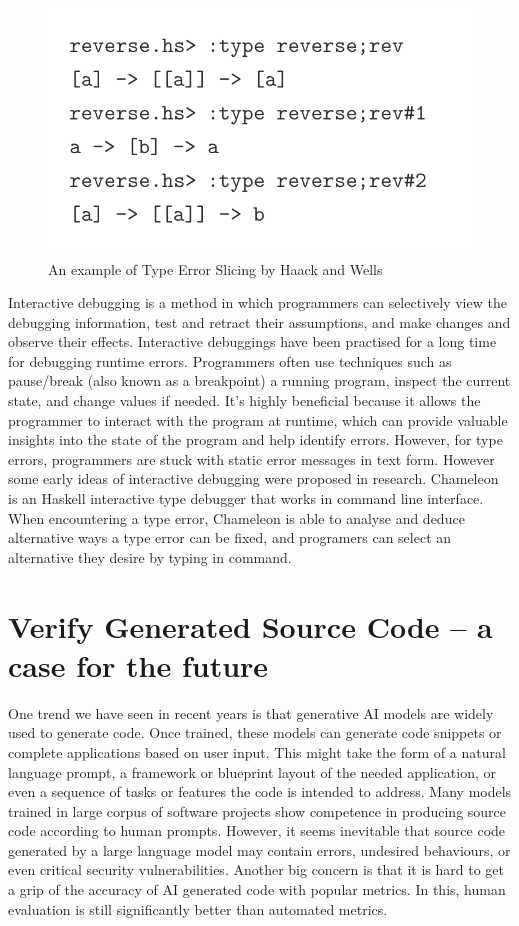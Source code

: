 \begin{figure}
    \includegraphics[]{ChameleonInteractive}
    \caption{An example of Type Error Slicing by Haack and Wells
    }
\end{figure}
Interactive debugging is a method in which programmers can selectively view the debugging information, test and retract their assumptions, and  make changes and observe their effects. Interactive debuggings have been practised for a long time for debugging runtime errors. Programmers often use techniques such as pause/break (also known as a breakpoint) a running program, inspect the current state, and change values if needed. It's highly beneficial because it allows the programmer to interact with the program at runtime, which can provide valuable insights into the state of the program and help identify errors. However, for type errors, programmers are stuck with static error messages in text form. However some early ideas of interactive debugging were proposed in research. Chameleon is an Haskell interactive type debugger that works in command line interface. When encountering a type error, Chameleon is able to analyse and deduce alternative ways a type error can be fixed, and programers can select an alternative they desire by typing in command.


\section{Verify Generated Source Code -- a case for the future}

One trend we have seen in recent years is that generative AI models are widely used to generate code. Once trained, these models can generate code snippets or complete applications based on user input. This might take the form of a natural language prompt, a framework or blueprint layout of the needed application, or even a sequence of tasks or features the code is intended to address. Many models trained in large corpus of software projects show competence in producing source code according to human prompts. However, it seems inevitable that source code generated by a large language model may contain errors, undesired behaviours, or even critical security vulnerabilities. Another big concern is that it is hard to get a grip of the accuracy of AI generated code with popular metrics. In this, human evaluation is still significantly better than automated metrics.


